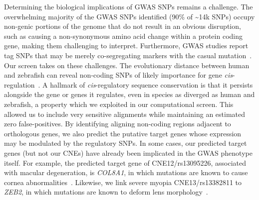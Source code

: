 Determining the biological implications of GWAS SNPs remains a
challenge. The overwhelming majority of the GWAS SNPs identified (90\%
of \textasciitilde{}14k SNPs) occupy non-genic portions of the genome
that do not result in an obvious disruption, such as causing a
non-synonymous amino acid change within a protein coding gene, making
them challenging to interpret. Furthermore, GWAS studies report tag SNPs
that may be merely co-segregating markers with the casual mutation~\citep{Tuupanen:2009dk, Nicolae:2010fk}. Our screen takes on
these challenges. The evolutionary distance between human and zebrafish
can reveal non-coding SNPs of likely importance for gene
\emph{cis}-regulation~\citep{Hiller:2013hr}. A hallmark of \emph{cis}-regulatory sequence conservation is
that it persists alongside the gene or genes it regulates, even in
species as diverged as human and zebrafish, a property which we
exploited in our computational screen. This allowed us to include very
sensitive alignments while maintaining an estimated zero
false-positives. By identifying aligning non-coding regions adjacent to
orthologous genes, we also predict the putative target genes whose
expression may be modulated by the regulatory SNPs. In some cases, our
predicted target genes (but not our CNEs) have already been implicated
in the GWAS phenotype itself. For example, the predicted target gene of
CNE12/rs13095226, associated with macular degeneration, is
\emph{COL8A1}, in which mutations are known to cause cornea
abnormalities~\citep{Hopfer:2005gy}.
Likewise, we link severe myopia CNE13/rs13382811 to \emph{ZEB2}, in
which mutations are known to deform lens morphology~\citep{Manthey:2014fy}.


